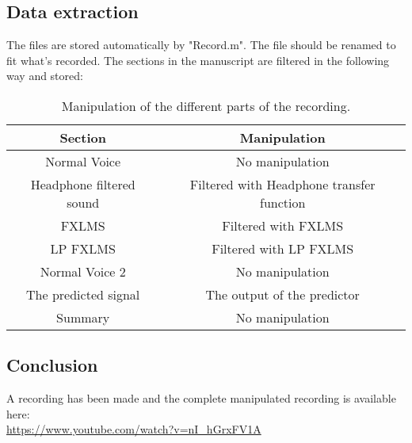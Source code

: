 %
\subsection{Data extraction}
The files are stored automatically by "Record.m". The file should be renamed to fit what's recorded. 
The sections in the manuscript are filtered in the following way and stored:
\begin{table}[H]
	\centering
	\begin{tabular}{ c c } \toprule
		{Section}				& {Manipulation} \\ \bottomrule 
		Normal Voice			& No manipulation  	\\
		Headphone filtered sound& Filtered with Headphone transfer function \\
		FXLMS					& Filtered with FXLMS	\\
		LP FXLMS 				& Filtered with LP FXLMS	\\
		Normal Voice 2			& No manipulation \\
		The predicted signal 	& The output of the predictor	\\
		Summary 				& No manipulation	\\
		\bottomrule
	\end{tabular}
	\caption{Manipulation of the different parts of the recording.}
	\label{tab:VoiceRecSections}
\end{table}



\subsection{Conclusion}
A recording has been made and the complete manipulated recording is available here: \\
\url{https://www.youtube.com/watch?v=nI_hGrxFV1A} 











